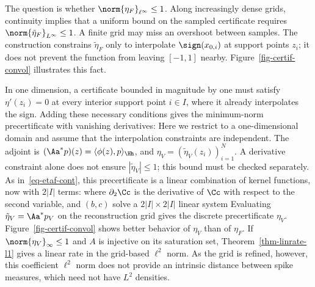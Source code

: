 The question is whether $\norm{\eta_F}_{\ell^\infty} \leq 1$. Along increasingly dense grids, continuity implies that a uniform bound on the sampled certificate requires $\norm{\tilde\eta_F}_{L^\infty}\leq1$. A finite grid may miss an overshoot between samples. The construction constrains $\tilde\eta_F$ only to interpolate $\sign(x_{0,i})$ at support points $z_i$; it does not prevent the function from leaving $[-1,1]$ nearby. Figure~\ref{fig-certif-convol} illustrates this fact.


In one dimension, a certificate bounded in magnitude by one must satisfy $\eta'(z_i)=0$ at every interior support point $i \in I$, where it already interpolates the sign. Adding these necessary conditions gives the minimum-norm precertificate with vanishing derivatives:
Here we restrict to a one-dimensional domain and assume that the interpolation constraints are independent. The adjoint is $(\Aa^*p)(z)=\langle\phi(z),p\rangle_\Hh$, and $\eta_V=(\tilde\eta_V(z_i))_{i=1}^N$. A derivative constraint alone does not ensure $|\tilde\eta_V|\leq1$; this bound must be checked separately.
As in~\eqref{eq-etaf-cont}, this precertificate is a linear combination of kernel functions, now with $2|I|$ terms:
where $\partial_2\Cc$ is the derivative of $\Cc$ with respect to the second variable, and $(b,c)$ solve a $2|I| \times 2|I|$ linear system
%
Evaluating $\tilde\eta_V=\Aa^*p_V$ on the reconstruction grid gives the discrete precertificate $\eta_V$.
%
Figure~\ref{fig-certif-convol} shows better behavior of $\eta_V$ than of $\eta_F$. If $\norm{\eta_V}_\infty\leq1$ and $A$ is injective on its saturation set, Theorem~\ref{thm-linrate-l1} gives a linear rate in the grid-based $\ell^2$ norm. As the grid is refined, however, this coefficient $\ell^2$ norm does not provide an intrinsic distance between spike measures, which need not have $L^2$ densities.
